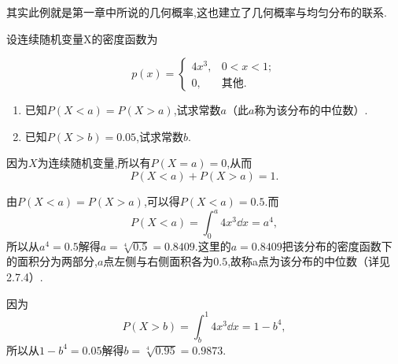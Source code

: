 其实此例就是第一章中所说的几何概率,这也建立了几何概率与均匀分布的联系.

\begin{example}
	设连续随机变量X的密度函数为
	
	\[
	  p(x) = \begin{cases}
	    4 x^3, & 0 < x < 1 ; \\
	    0, & \text{其他}.
	  \end{cases}
	\]
	\begin{enumerate}[label=(\arabic*)]
	  \item  已知$ P(X<a)=P(X>a) $,试求常数$ a $（此$ a $称为该分布的中位数）.
	  \item 已知$ P(X>b)=0.05 $,试求常数$ b $.
	\end{enumerate}
\end{example}
\begin{solution}
    \begin{inparaenum}[(1)]
	  \item  因为$ X $为连续随机变量,所以有$ P(X=a)=0 $,从而
	  \[
	    P(X < a) + P(X > a) = 1.
	  \]
	
	由$ P(X<a)=P(X>a) $,可以得$ P(X<a)=0.5 $.而
	  \[
	    P(X < a) = \int_{0}^{a} 4 x^{3} \dd x=a^{4},
	  \]
	所以从$ a^4=0.5 $解得$a=\sqrt[4]{0.5}=0.8409$.这里的$ a=0.8409 $把该分布的密度函数下的面积分为两部分,$ a $点左侧与右侧面积各为$ 0.5 $,故称a点为该分布的中位数（详见2.7.4）.
	
	\item  因为
	\[
	  P (X > b) = \int_{b}^{1} 4 x^{3} \dd  x = 1 - b^{4},
	\]
	所以从$1-b^{4}=0.05$解得$b=\sqrt[4]{0.95}=0.9873$.
  \end{inparaenum}
\end{solution}


